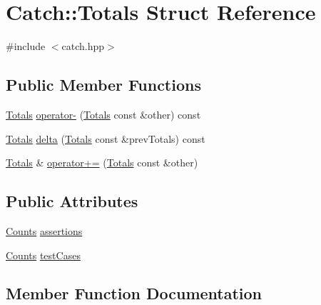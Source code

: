 \hypertarget{struct_catch_1_1_totals}{}\section{Catch\+:\+:Totals Struct Reference}
\label{struct_catch_1_1_totals}


{\ttfamily \#include $<$catch.\+hpp$>$}

\subsection*{Public Member Functions}
\begin{DoxyCompactItemize}
\item 
\mbox{\hyperlink{struct_catch_1_1_totals}{Totals}} \mbox{\hyperlink{struct_catch_1_1_totals_a9279ed39139cb7e7b291918a6d08290e}{operator-\/}} (\mbox{\hyperlink{struct_catch_1_1_totals}{Totals}} const \&other) const
\item 
\mbox{\hyperlink{struct_catch_1_1_totals}{Totals}} \mbox{\hyperlink{struct_catch_1_1_totals_a1a94a654f5f3786b75695e081fc9bca2}{delta}} (\mbox{\hyperlink{struct_catch_1_1_totals}{Totals}} const \&prev\+Totals) const
\item 
\mbox{\hyperlink{struct_catch_1_1_totals}{Totals}} \& \mbox{\hyperlink{struct_catch_1_1_totals_a574015076e54cc405c70b053e3356e43}{operator+=}} (\mbox{\hyperlink{struct_catch_1_1_totals}{Totals}} const \&other)
\end{DoxyCompactItemize}
\subsection*{Public Attributes}
\begin{DoxyCompactItemize}
\item 
\mbox{\hyperlink{struct_catch_1_1_counts}{Counts}} \mbox{\hyperlink{struct_catch_1_1_totals_a885ded66df752147b30c3d45aa602ec9}{assertions}}
\item 
\mbox{\hyperlink{struct_catch_1_1_counts}{Counts}} \mbox{\hyperlink{struct_catch_1_1_totals_adb195fe477aedee2ecea88c888f16506}{test\+Cases}}
\end{DoxyCompactItemize}


\subsection{Member Function Documentation}
\mbox{\label{struct_catch_1_1_totals_a1a94a654f5f3786b75695e081fc9bca2}} 
